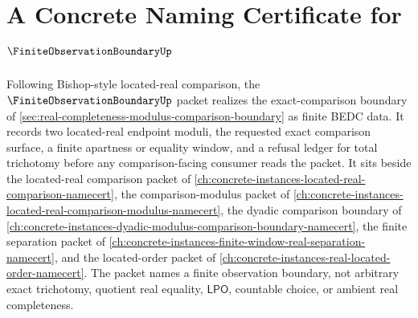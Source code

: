 \chapter{A Concrete Naming Certificate for $\FiniteObservationBoundaryUp$}
\label{ch:concrete-instances-finite-observation-boundary-namecert}

Following Bishop-style located-real comparison, the $\FiniteObservationBoundaryUp$ packet realizes the exact-comparison boundary of \autoref{sec:real-completeness-modulus-comparison-boundary} as finite BEDC data. It records two located-real endpoint moduli, the requested exact comparison surface, a finite apartness or equality window, and a refusal ledger for total trichotomy before any comparison-facing consumer reads the packet. It sits beside the located-real comparison packet of \autoref{ch:concrete-instances-located-real-comparison-namecert}, the comparison-modulus packet of \autoref{ch:concrete-instances-located-real-comparison-modulus-namecert}, the dyadic comparison boundary of \autoref{ch:concrete-instances-dyadic-modulus-comparison-boundary-namecert}, the finite separation packet of \autoref{ch:concrete-instances-finite-window-real-separation-namecert}, and the located-order packet of \autoref{ch:concrete-instances-real-located-order-namecert}. The packet names a finite observation boundary, not arbitrary exact trichotomy, quotient real equality, $\mathsf{LPO}$, countable choice, or ambient real completeness.

